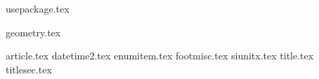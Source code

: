 
{usepackage.tex}


{geometry.tex}

{article.tex}
{datetime2.tex}
{enumitem.tex}
{footmisc.tex}
{siunitx.tex}
{title.tex}
{titlesec.tex}
